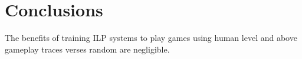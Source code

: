 \chapter{Conclusions}
The benefits of training ILP systems to play games using human level and above gameplay traces verses random are negligible.